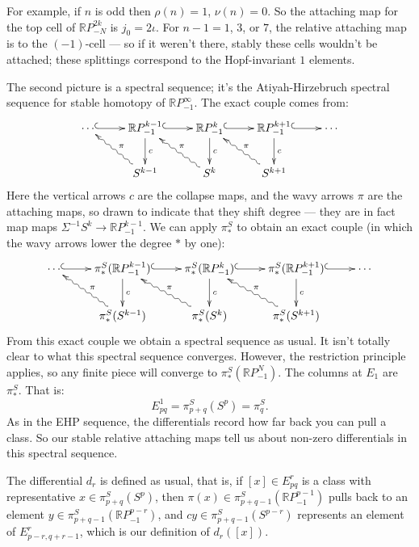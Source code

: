 \documentclass{article}
\newcommand{\R}{\mathbb{R}}
\newcommand{\RP}{\R P}
\renewcommand{\to}{\longrightarrow}
\theoremstyle{definition}
\begin{document}
For example, if $n$ is odd then $\rho(n) = 1$, $\nu(n) = 0$.  So the attaching map for the top cell of $\RP^{2k}_{-N}$ is $j_0 = 2\iota$.  For $n-1 = 1$, $3$, or $7$, the relative attaching map is to the $(-1)$-cell --- so if it weren't there, stably these cells wouldn't be attached; these splittings correspond to the Hopf-invariant $1$ elements.

The second picture is a spectral sequence; it's the Atiyah-Hirzebruch spectral sequence for stable homotopy of $\RP^\infty_{-1}$.  The exact couple comes from:
\[\xymatrix{
\cdots\ar@{^{(}->}[r]&\RP^{k-1}_{-1}\ar@{^{(}->}[r]\ar[d]^{c}&\RP^{k}_{-1}\ar@{^{(}->}[r]\ar[d]^{c}&\RP^{k+1}_{-1}\ar@{^{(}->}[r]\ar[d]^{c}&\cdots\\
&S^{k-1}\ar@{~>}[ul]_\pi&S^k\ar@{~>}[ul]_\pi&S^{k+1}\ar@{~>}[ul]_\pi
}\]
Here the vertical arrows $c$ are the collapse maps,
and the wavy arrows $\pi$ are the attaching maps, so drawn to indicate that they shift degree --- they are in fact map maps $\Sigma^{-1}S^k\to\RP^{k-1}_{-1}$. We can apply $\pi_*^S$ to obtain an exact couple (in which the wavy arrows lower the degree $*$ by one):
\[\xymatrix{
\cdots\ar@{^{(}->}[r]&\pi_*^S(\RP^{k-1}_{-1})\ar@{^{(}->}[r]\ar[d]^{c}&\pi_*^S(\RP^{k}_{-1})\ar@{^{(}->}[r]\ar[d]^{c}&\pi_*^S(\RP^{k+1}_{-1})\ar@{^{(}->}[r]\ar[d]^{c}&\cdots\\
&\pi_*^S(S^{k-1})\ar@{~>}[ul]_\pi&\pi_*^S(S^k)\ar@{~>}[ul]_\pi&\pi_*^S(S^{k+1})\ar@{~>}[ul]_\pi
}\]
From this exact couple we obtain a spectral sequence as usual. It isn't totally clear to what this spectral sequence converges.  However, the restriction principle applies, so any finite piece will converge to $\pi_*^S (\RP^N_{-1})$. The columns at $E_1$ are $\pi_*^S$. That is:
\[E^1_{pq}=\pi^S_{p+q}(S^p)=\pi^S_q.\]
As in the EHP sequence, the differentials record how far back you can pull a class.  So our stable relative attaching maps tell us about non-zero differentials in this spectral sequence. 

The differential $d_r$ is defined as usual, that is, if $[x]\in E_{pq}^r$ is a class with representative $x\in\pi^S_{p+q}(S^p)$, then $\pi(x)\in\pi^S_{p+q-1}(\RP^{p-1}_{-1})$ pulls back to an element $y\in \pi^S_{p+q-1}(\RP^{p-r}_{-1})$, and $cy\in \pi^S_{p+q-1}(S^{p-r})$ represents an element of $E_{p-r,q+r-1}^r$, which is our definition of $d_r([x])$.
\end{document}
